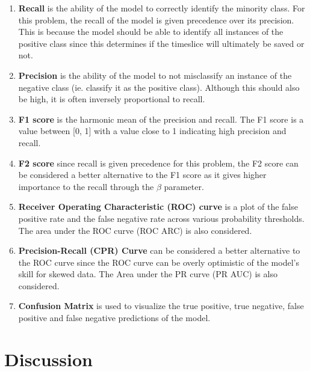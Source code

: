 \begin{enumerate}
\item \textbf{Recall} is the ability of the model to correctly
  identify the minority class. For this problem, the recall of the
  model is given precedence over its precision. This is because the
  model should be able to identify all instances of the positive class
  since this determines if the timeslice will ultimately be saved or
  not.
\item \textbf{Precision} is the ability of the model to not
  misclassify an instance of the negative class (ie. classify it as
  the positive class). Although this should also be high, it is often
  inversely proportional to recall.
\item \textbf{F1 score} is the harmonic mean of the precision and
  recall. The F1 score is a value between [0, 1] with a value close to
  1 indicating high precision and recall.
\item \textbf{F2 score} since recall is given precedence for this
  problem, the F2 score can be considered a better alternative to the
  F1 score as it gives higher importance to the recall through the
  $\beta$ parameter.
\item \textbf{Receiver Operating Characteristic (ROC) curve} is a plot
  of the false positive rate and the false negative rate across
  various probability thresholds. The area under the ROC curve (ROC
  ARC) is also considered.
\item \textbf{Precision-Recall (CPR) Curve} can be considered a better
  alternative to the ROC curve since the ROC curve can be overly
  optimistic of the model's skill for skewed data. The Area under the
  PR curve (PR AUC) is also considered.
\item \textbf{Confusion Matrix} is used to visualize the true
  positive, true negative, false positive and false negative
  predictions of the model.
\end{enumerate}

\section{Discussion}
\label{sec:pm-disc}



